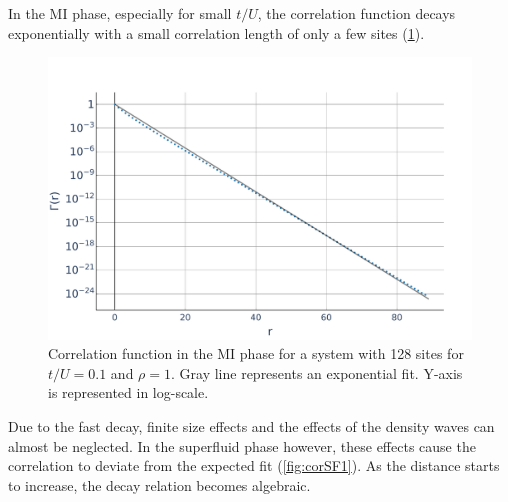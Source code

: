 \documentclass[twoside,twocolumn,9pt]{article}
\begin{document}
In the MI phase, especially for small $t/U$, the correlation function decays exponentially with a small correlation length of only a few sites (\cref{fig:corMI1}). 
\begin{center}
  \begin{figure}
      \includegraphics[width=\linewidth]{../code/figures/Correlations-MI1.pdf}
      \caption{Correlation function in the MI phase for a system with 128 sites for $t/U=0.1$ and $\rho=1$. Gray line represents an exponential fit. Y-axis is represented in log-scale.}
      \label{fig:corMI1}
  \end{figure}
\end{center}
Due to the fast decay, finite size effects and the effects of the density waves can almost be neglected. In the superfluid phase however, these effects cause the correlation to deviate from the expected fit (\cref{fig:corSF1}). As the distance starts to increase, the decay relation becomes algebraic.
\end{document}
